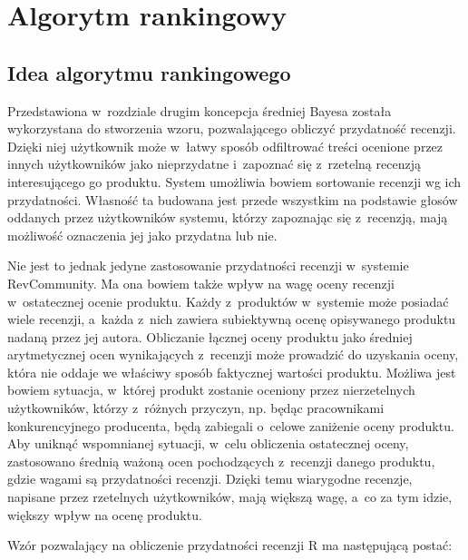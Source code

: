 \chapter{Algorytm rankingowy}

\section{Idea algorytmu rankingowego}

Przedstawiona w~rozdziale drugim koncepcja średniej Bayesa została wykorzystana do stworzenia wzoru, pozwalającego obliczyć przydatność recenzji. Dzięki niej użytkownik może w~łatwy sposób odfiltrować treści ocenione przez innych użytkowników jako nieprzydatne i~zapoznać się z~rzetelną recenzją interesującego go produktu. System umożliwia bowiem sortowanie recenzji wg ich przydatności. Własność ta budowana jest przede wszystkim na podstawie głosów oddanych przez użytkowników systemu, którzy zapoznając się z~recenzją, mają możliwość oznaczenia jej jako przydatna lub nie.

Nie jest to jednak jedyne zastosowanie przydatności recenzji w~systemie RevCommunity. Ma ona bowiem także wpływ na wagę oceny recenzji w~ostatecznej ocenie produktu. Każdy z~produktów w~systemie może posiadać wiele recenzji, a~każda z~nich zawiera subiektywną ocenę opisywanego produktu nadaną przez jej autora. Obliczanie łącznej oceny produktu jako średniej arytmetycznej ocen wynikających z~recenzji może prowadzić do uzyskania oceny, która nie oddaje we właściwy sposób faktycznej wartości produktu. Możliwa jest bowiem sytuacja, w~której produkt zostanie oceniony przez nierzetelnych użytkowników, którzy z~różnych przyczyn, np. będąc pracownikami konkurencyjnego producenta, będą zabiegali o~celowe zaniżenie oceny produktu. Aby uniknąć wspomnianej sytuacji, w~celu obliczenia ostatecznej oceny, zastosowano średnią ważoną ocen pochodzących z~recenzji danego produktu, gdzie wagami są przydatności recenzji. Dzięki temu wiarygodne recenzje, napisane przez rzetelnych użytkowników, mają większą wagę, a~co za tym idzie, większy wpływ na ocenę produktu.

Wzór pozwalający na obliczenie przydatności recenzji R ma następującą postać:

